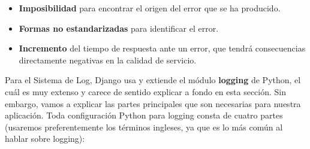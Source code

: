     \begin{itemize}
        \item \textbf{Imposibilidad} para encontrar el origen del error que se ha
        producido.
        \item \textbf{Formas no estandarizadas} para identificar el error.
        \item \textbf{Incremento} del tiempo de respuesta ante un error, que tendrá
        consecuencias directamente negativas en la calidad de servicio.
    \end{itemize}

Para el Sistema de Log, Django usa y extiende el módulo \textbf{logging}
\cite{python-logging} de Python, el cuál es muy extenso y carece de sentido explicar a
fondo en esta sección. Sin embargo, vamos a explicar las partes principales que son
necesarias para nuestra aplicación. Toda configuración Python para logging consta de
cuatro partes (usaremos preferentemente los términos ingleses, ya que es lo más común al
hablar sobre logging):


